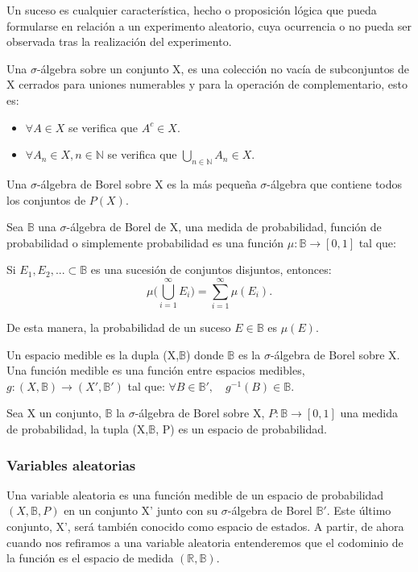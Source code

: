 \documentclass[../proyecto.tex]{memoir}
\begin{document}

Un suceso es cualquier característica, hecho o proposición lógica que pueda formularse en relación a un experimento aleatorio, cuya ocurrencia o no pueda ser observada tras la realización del experimento.

Una $\sigma$-álgebra sobre un conjunto X, es una colección no vacía de subconjuntos de X cerrados para uniones numerables y para la operación de complementario, esto es:
\begin{itemize}
\item $\forall A \in X$ se verifica que $A^{c} \in X$.
\item $ \forall A_{n} \in X, n \in \mathds{N} $ se verifica que $\bigcup _{n \in \mathds{N}} A_{n} \in X$.
\end{itemize}
 
Una $\sigma$-álgebra de Borel sobre X es la más pequeña $\sigma$-álgebra que contiene todos los conjuntos de $P(X)$. 
 
Sea $\mathds{B}$ una $\sigma$-álgebra de Borel de X, una medida de probabilidad, función de probabilidad o simplemente probabilidad es una función $\mu: \mathds{B} \rightarrow [0,1] $ tal que: 

Si $E_{1}, E_{2},... \subset \mathds{B}$ es una sucesión de conjuntos disjuntos, entonces:
\begin{equation*}
 \mu \big( \bigcup _{i=1} ^{\infty} E_{i} \big) = \sum _{i=1}^{\infty} \mu ( E_{i} ).
\end{equation*}

De esta manera, la probabilidad de un suceso $E \in \mathds{B}$ es $\mu(E)$.

Un espacio medible es la dupla (X,$\mathds{B}$) donde $\mathds{B}$ es la $\sigma$-álgebra de Borel sobre X. Una función medible es una función entre espacios medibles, $g:  (X,\mathds{B}) \rightarrow (X',\mathds{B}')$ tal que: $ \forall B \in \mathds{B}', \quad g^{-1}(B) \in \mathds{B}$.

Sea X un conjunto, $\mathds{B}$ la $\sigma$-álgebra de Borel sobre X, $P: \mathds{B} \rightarrow [0,1] $ una medida de probabilidad, la tupla (X,$\mathds{B}$, P) es un espacio de probabilidad. 

\subsubsection{Variables aleatorias}

Una variable aleatoria es una función medible de un espacio de probabilidad $(X, \mathds{B}, P)$ en un conjunto X' junto con su $\sigma$-álgebra de Borel $\mathds{B}'$. Este último conjunto, X', será también conocido como espacio de estados. A partir, de ahora cuando nos refiramos a una variable aleatoria entenderemos que el codominio de la función es el espacio de medida $(\mathds{R},\mathds{B})$.
\end{document}
